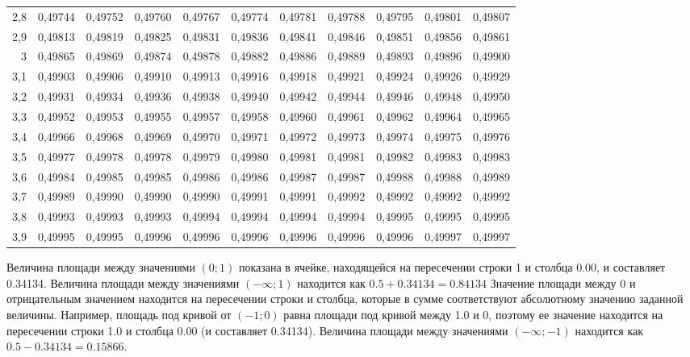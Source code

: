 \documentclass[12pt,a4paper]{article}
\begin{document}
\begin{table}[H]
\begin{tabular}{rrrrrrrrrrr}
    2,8   & 0,49744 & 0,49752 & 0,49760 & 0,49767 & 0,49774 & 0,49781 & 0,49788 & 0,49795 & 0,49801 & 0,49807 \\
    2,9   & 0,49813 & 0,49819 & 0,49825 & 0,49831 & 0,49836 & 0,49841 & 0,49846 & 0,49851 & 0,49856 & 0,49861 \\
    3     & 0,49865 & 0,49869 & 0,49874 & 0,49878 & 0,49882 & 0,49886 & 0,49889 & 0,49893 & 0,49896 & 0,49900 \\
    3,1   & 0,49903 & 0,49906 & 0,49910 & 0,49913 & 0,49916 & 0,49918 & 0,49921 & 0,49924 & 0,49926 & 0,49929 \\
    3,2   & 0,49931 & 0,49934 & 0,49936 & 0,49938 & 0,49940 & 0,49942 & 0,49944 & 0,49946 & 0,49948 & 0,49950 \\
    3,3   & 0,49952 & 0,49953 & 0,49955 & 0,49957 & 0,49958 & 0,49960 & 0,49961 & 0,49962 & 0,49964 & 0,49965 \\
    3,4   & 0,49966 & 0,49968 & 0,49969 & 0,49970 & 0,49971 & 0,49972 & 0,49973 & 0,49974 & 0,49975 & 0,49976 \\
    3,5   & 0,49977 & 0,49978 & 0,49978 & 0,49979 & 0,49980 & 0,49981 & 0,49981 & 0,49982 & 0,49983 & 0,49983 \\
    3,6   & 0,49984 & 0,49985 & 0,49985 & 0,49986 & 0,49986 & 0,49987 & 0,49987 & 0,49988 & 0,49988 & 0,49989 \\
    3,7   & 0,49989 & 0,49990 & 0,49990 & 0,49990 & 0,49991 & 0,49991 & 0,49992 & 0,49992 & 0,49992 & 0,49992 \\
    3,8   & 0,49993 & 0,49993 & 0,49993 & 0,49994 & 0,49994 & 0,49994 & 0,49994 & 0,49995 & 0,49995 & 0,49995 \\
    3,9   & 0,49995 & 0,49995 & 0,49996 & 0,49996 & 0,49996 & 0,49996 & 0,49996 & 0,49996 & 0,49997 & 0,49997 \\
    \bottomrule
    \end{tabular}%
  \label{tab:addlabel}%
\end{table}%
\fontsize{10pt}{10pt}\selectfont
Величина площади между значениями $(0;1)$ показана в ячейке, находящейся на пересечении строки  1 и столбца  0.00, и составляет 0.34134. Величина площади между значениями $(-\infty;1)$ находится как $0.5+0.34134=0.84134$
Значение площади между 0 и отрицательным значением находится на пересечении строки и столбца, которые в сумме соответствуют абсолютному значению заданной величины. Например, площадь под кривой от  $(-1;0)$ равна площади под кривой между  1.0 и 0, поэтому ее значение находится на пересечении строки  1.0 и столбца  0.00 (и составляет 0.34134). Величина площади между значениями $(-\infty;-1)$ находится как $0.5-0.34134=0.15866$.
\end{document}

